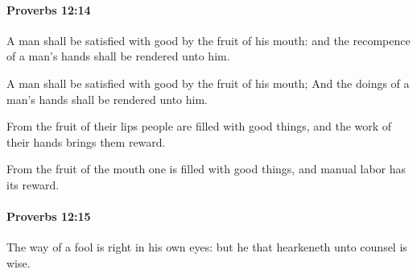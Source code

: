 		\paragraph{Proverbs 12:14} %
			\label{PROVERBS-12-14}

			A man shall be satisfied with good by the fruit of his mouth: and the recompence of a man’s hands shall be rendered unto him.

			\begin{versebox}
					\item[BHS] 
					\item[ASV] A man shall be satisfied with good by the fruit of his mouth; And the doings of a man's hands shall be rendered unto him.
					\item[NIV] From the fruit of their lips people are filled with good things, and the work of their hands brings them reward.
					\item[NRSV] From the fruit of the mouth one is filled with good things, and manual labor has its reward.
			\end{versebox}

		\paragraph{Proverbs 12:15} %
			\label{PROVERBS-12-15}

			The way of a fool is right in his own eyes: but he that hearkeneth unto counsel is wise.

